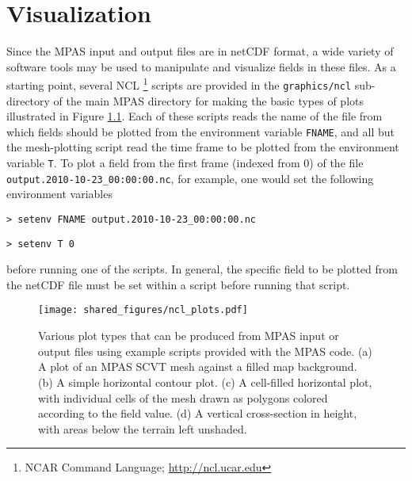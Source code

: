 
\chapter{Visualization}

Since the MPAS input and output files are in netCDF format, a wide variety of software
tools may be used to manipulate and visualize fields in these files. As a starting point, several NCL \footnote{NCAR Command Language; \url{http://ncl.ucar.edu}}
scripts are provided in the {\tt graphics/ncl} sub-directory
of the main MPAS directory for making the basic types of plots illustrated in Figure \ref{fig:ncl_plots}. Each of
these scripts reads the name of the file from which fields should be plotted from the environment variable {\tt FNAME},
and all but the mesh-plotting script read the time frame to be plotted from the environment variable {\tt T}. To plot
a field from the first frame (indexed from 0) of the file {\tt output.2010-10-23\_00:00:00.nc}, for example, one would set the 
following environment variables 

\vspace{12pt}
{\tt > setenv FNAME output.2010-10-23\_00:00:00.nc}

{\tt > setenv T 0}
\vspace{12pt}

\noindent before running one of the scripts. In general, the specific field to be plotted from the netCDF file must be set 
within a script before running that script. 

\begin{figure}[htb]
\begin{center}
\texttt{[image: shared\_figures/ncl\_plots.pdf]}
\caption{Various plot types that can be produced from MPAS input or output files using example scripts provided with the MPAS code.
(a) A plot of an MPAS SCVT mesh against a filled map background. (b) A simple horizontal contour plot. (c) A cell-filled horizontal plot, with
individual cells of the mesh drawn as polygons colored according to the field value. (d) A vertical cross-section in height, with areas below the
terrain left unshaded.}
\label{fig:ncl_plots}
\end{center}
\end{figure}


